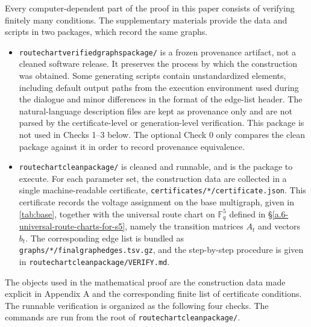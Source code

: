 \documentclass[11pt]{article}
\theoremstyle{definition}
\theoremstyle{remark}
\providecommand{\tightlist}{\setlength{\itemsep}{0pt}\setlength{\parskip}{0pt}}
\renewcommand{\_}{\textunderscore\allowbreak}
\begin{document}
Every computer-dependent part of the proof in this paper consists of
verifying finitely many conditions. The supplementary materials provide the
data and scripts in two packages, which record the same graphs.

\begin{itemize}
\tightlist
\item
  \texttt{route\_chart\_verified\_graphs\_package/} is a frozen
  provenance artifact, not a cleaned software release. It preserves the
  process by which the construction was obtained. Some generating
  scripts contain unstandardized elements, including default output
  paths from the execution environment used during the dialogue and
  minor differences in the format of the edge-list header. The
  natural-language description files are kept as provenance only and are
  not parsed by the certificate-level or generation-level verification.
  This package is not used in Checks 1--3 below. The optional Check 0
  only compares the clean package against it in order to record
  provenance equivalence.
\item
  \texttt{route\_chart\_clean\_package/} is cleaned and runnable, and is
  the package to execute. For each parameter set, the construction data
  are collected in a single machine-readable certificate,
  \texttt{certificates/*/certificate.json}. This certificate records the
  voltage assignment on the base multigraph, given in \cref{tab:base},
  together with the universal route chart on \(\mathbb F_q^5\) defined
  in \S\ref{a.6-universal-route-charts-for-s5}, namely the transition matrices \(A_t\) and vectors \(b_t\).
  The corresponding edge list is bundled as
  \texttt{graphs/*/final\_graph\_edges.tsv.gz}, and the step-by-step
  procedure is given in \texttt{route\_chart\_clean\_package/VERIFY.md}.
\end{itemize}

The objects used in the mathematical proof are the construction data made
explicit in Appendix A and the corresponding finite list of certificate
conditions.
The runnable verification is organized as the following four checks. The
commands are run from the root of
\texttt{route\_chart\_clean\_package/}.
\end{document}
